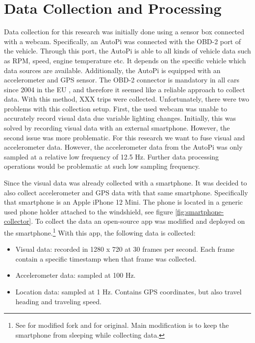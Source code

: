 \clearpage
\section{Data Collection and Processing}

Data collection for this research was initially done using a sensor box connected with a webcam. Specifically, an AutoPi \cite{AutoPi} was connected with the OBD-2 port of the vehicle. Through this port, the AutoPi is able to all kinds of vehicle data such as RPM, speed, engine temperature etc. It depends on the specific vehicle which data sources are available. Additionally, the AutoPi is equipped with an accelerometer and GPS sensor. The OBD-2 connector is mandatory in all cars since 2004 in the EU\cite{EU1998} , and therefore it seemed like a reliable approach to collect data. With this method, XXX trips were collected. Unfortunately, there were two problems with this collection setup. First, the used webcam was unable to accurately record visual data due variable lighting changes. Initially, this was solved by recording visual data with an external smartphone. However, the second issue was more problematic. For this research we want to fuse visual and accelerometer data. However, the accelerometer data from the AutoPi was only sampled at a relative low frequency of 12.5 Hz. Further data processing operations would be problematic at such low sampling frequency.

Since the visual data was already collected with a smartphone. It was decided to also collect accelerometer and GPS data with that same smartphone. Specifically that smartphone is an Apple iPhone 12 Mini. The phone is located in a generic used phone holder attached to the windshield, see figure \ref{fig:smartphone-collector}. To  collect the data an open-source app was modified and deployed on the smartphone.\footnote{See \cite{ios_logger} for modified fork and \cite{ios_logger_original} for original. Main modification is to keep the smartphone from sleeping while collecting data.} With this app, the following data is collected:
\begin{itemize}
\item Visual data: recorded in 1280 x 720 at 30 frames per second. Each frame contain a specific timestamp when that frame was collected.
\item Accelerometer data: sampled at 100 Hz. 
\item Location data: sampled at 1 Hz. Contains GPS coordinates, but also travel heading and traveling speed.
\end{itemize}


